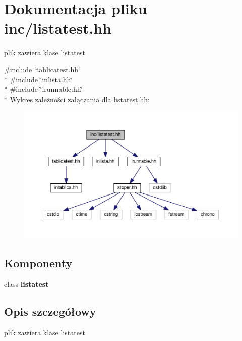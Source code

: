 \section{Dokumentacja pliku inc/listatest.hh}
\label{listatest_8hh}


plik zawiera klase listatest  


{\ttfamily \#include \char`\"{}tablicatest.\+hh\char`\"{}}\\*
{\ttfamily \#include \char`\"{}inlista.\+hh\char`\"{}}\\*
{\ttfamily \#include \char`\"{}irunnable.\+hh\char`\"{}}\\*
Wykres zależności załączania dla listatest.\+hh\+:
\nopagebreak
\begin{figure}[H]
\begin{center}
\leavevmode
\includegraphics[width=350pt]{listatest_8hh__incl}
\end{center}
\end{figure}
\subsection*{Komponenty}
\begin{DoxyCompactItemize}
\item 
class {\bf listatest}
\end{DoxyCompactItemize}


\subsection{Opis szczegółowy}
plik zawiera klase listatest 

